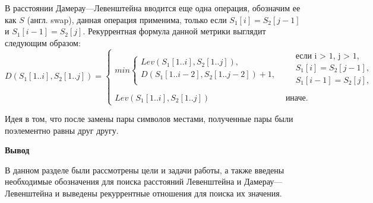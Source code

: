 В расстоянии Дамерау---Левенштейна вводится еще одна операция, обозначим ее как $S$ (англ. swap), данная операция применима, только  если $S_{1}[i] = S_{2}[j - 1]$
и $S_{1}[i - 1] = S_{2}[j]$. Рекуррентная формула  данной метрики выглядит следующим образом:
\small
\begin{equation}
	\label{eq:DL}
	D(S_{1}[1..i],S_{2}[1..j]) = 
	\begin{cases}
		min \begin{cases}
			Lev(S_{1}[1..i],S_{2}[1..j]),\\
			D(S_{1}[1..i - 2],S_{2}[1..j - 2]) + 1, \\
		\end{cases}
		& \begin{aligned}
			& \text{если i > 1, j > 1}, \\
			& S_{1}[i] = S_{2}[j - 1], \\
			& S_{1}[i - 1] = S_{2}[j], \\
		\end{aligned}\\
		Lev(S_{1}[1..i],S_{2}[1..j])
		 & \text{иначе.}
	\end{cases}
\end{equation}

Идея в том, что после замены пары символов местами, полученные пары были поэлементно равны друг другу.

\textbf{Вывод}

В данном разделе были рассмотрены цели и задачи работы, а также введены необходимые обозначения для поиска расстояний Левенштейна и Дамерау---Левенштейна
и выведены рекуррентные отношения для поиска их значения.

